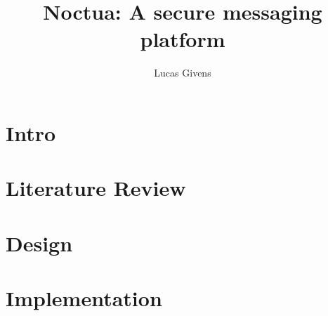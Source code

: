 \documentclass{article}
\title{Noctua: A secure messaging platform}
\author{Lucas Givens}
\begin{document}
\maketitle


\section{Intro}




\section{Literature Review}




\section{Design}




\section{Implementation}




\end{document}
